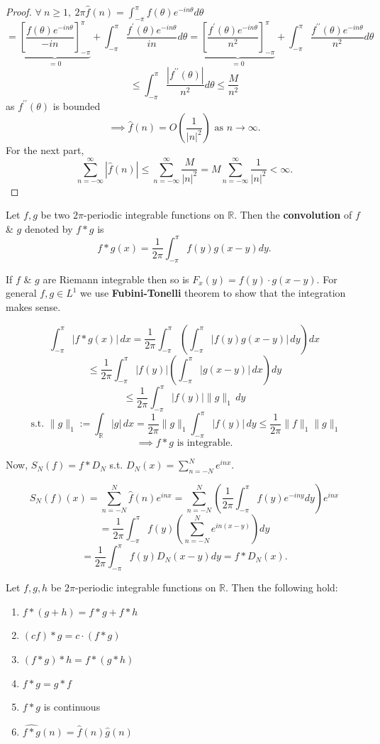 \documentclass{functionspaces}
\begin{document}
\begin{proof}
$\forall\ n\geq 1,\ 2\pi\hat{f}(n)=\int_{-\pi}^{\pi}f(\theta)e^{-in\theta}d\theta$
\[
=\underbrace{\left[\frac{f(\theta)e^{-in\theta}}{-in}\right]_{-\pi}^{\pi}}_{=0}+\int_{-\pi}^{\pi}\frac{f^{\prime}(\theta)e^{-in\theta}}{in}d\theta=\underbrace{\left[\frac{f^{\prime}(\theta)e^{-in\theta}}{n^{2}}\right]_{-\pi}^{\pi}}_{=0}+\int_{-\pi}^{\pi}\frac{f^{\prime\prime}(\theta)e^{-in\theta}}{n^{2}}d\theta
\]
\[
\leq\int_{-\pi}^{\pi}\frac{\left|f^{\prime\prime}(\theta)\right|}{n^{2}}d\theta\leq\frac{M}{n^{2}}
\]
as $f^{\prime\prime}(\theta)$ is bounded
\[
\implies\hat{f}(n)=O\left(\frac{1}{\left|n\right|^{2}}\right)\text{ as }n\to\infty.
\]
For the next part,
\[
\sum_{n=-\infty}^{\infty}|\hat{f}(n)|\leq\sum_{n=-\infty}^{\infty}\frac{M}{|n|^{2}}=M\sum_{n=-\infty}^{\infty}\frac{1}{|n|^{2}}<\infty.
\]
\end{proof}

\begin{definition}[Convolution]\label{def:convolution}
Let $f,g$ be two $2\pi$-periodic integrable functions on $\mathbb{R}$. Then the \textbf{convolution} of $f$ \& $g$ denoted by $f*g$ is
\[
f*g(x)=\frac{1}{2\pi}\int_{-\pi}^{\pi}f(y)g(x-y)dy.
\]
\end{definition}

If $f$ \& $g$ are Riemann integrable then so is $F_{x}(y)=f(y)\cdot g(x-y).$ For general $f,g\in L^{1}$ we use \textbf{Fubini-Tonelli} theorem to show that the integration makes sense.

\[
\int_{-\pi}^{\pi}|f*g(x)|\,dx =\frac{1}{2\pi}\int_{-\pi}^{\pi}\left(\int_{-\pi}^{\pi}|f(y)g(x-y)|\,dy\right)dx
\]
\[
\leq\frac{1}{2\pi}\int_{-\pi}^{\pi}\left|f(y)\right|\left(\int_{-\pi}^{\pi}\left|g(x-y)\right|\,dx\right)dy
\]
\[
\leq\frac{1}{2\pi}\int_{-\pi}^{\pi}\left|f(y)\right|\|g\|_{1}\,dy
\]
\[
\text{ s.t. }\|g\|_{1}:=\int_{\mathbb{R}}|g|\,dx=\frac{1}{2\pi}\|g\|_{1}\int_{-\pi}^{\pi}\left|f(y)\right|\,dy\leq\frac{1}{2\pi}\|f\|_{1}\|g\|_{1}
\]
$$ \implies f*g \text{ is integrable.} $$

Now, $S_{N}(f)=f*D_{N}$ s.t. $D_{N}(x)=\sum_{n=-N}^{N}e^{inx}$.

\[
S_{N}(f)(x)=\sum_{n=-N}^{N}\hat{f}(n)e^{inx} =\sum_{n=-N}^{N}\left(\frac{1}{2\pi}\int_{-\pi}^{\pi}f(y)e^{-iny}dy\right)e^{inx}
\]
\[
=\frac{1}{2\pi}\int_{-\pi}^{\pi}f(y)\left(\sum_{n=-N}^{N}e^{in(x-y)}\right)dy
\]
\[
=\frac{1}{2\pi}\int_{-\pi}^{\pi}f(y)D_{N}(x-y)dy=f*D_{N}(x).
\]

\begin{proposition}\label{prop:convolution_properties}
Let $f,g,h$ be $2\pi$-periodic integrable functions on $\mathbb{R}$. Then the following hold:
\begin{enumerate}
\item $f*(g+h)=f*g+f*h$
\item $(cf)*g=c\cdot(f*g)$
\item $(f*g)*h=f*(g*h)$
\item $f*g=g*f$
\item $f*g$ is continuous
\item $\widehat{f*g}(n)=\hat{f}(n)\hat{g}(n)$
\end{enumerate}
\end{proposition}
\end{document}
